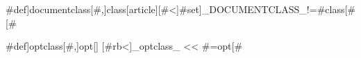 {#def]documentclass[#,]class[article][#<]{#set]_DOCUMENTCLASS_!=#{class}[#}[#}

{#def]optclass[#,]opt[] [#rb<]_optclass_ << #{=opt}[#}